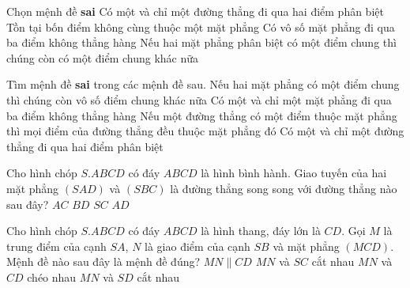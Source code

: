 \begin{ex}%
	Chọn mệnh đề {\bf sai}
	\choice
	{Có một và chỉ một đường thẳng đi qua hai điểm phân biệt}
	{Tồn tại bốn điểm không cùng thuộc một mặt phẳng}
	{\True Có vô số mặt phẳng đi qua ba điểm không thẳng hàng}
	{Nếu hai mặt phẳng phân biệt có một điểm chung thì chúng còn có một điểm chung khác nữa}
\end{ex}
\begin{ex}%
	Tìm mệnh đề \textbf{sai} trong các mệnh đề sau.
	\choice
	{Nếu hai mặt phẳng có một điểm chung thì chúng còn vô số điểm chung khác nữa}
	{Có một và chỉ một mặt phẳng đi qua ba điểm không thẳng hàng}
	{\True Nếu một đường thẳng có một điểm thuộc mặt phẳng thì mọi điểm của đường thẳng đều thuộc mặt phẳng đó}
	{Có một và chỉ một đường thẳng đi qua hai điểm phân biệt}
\end{ex}
\begin{ex}%
	Cho hình chóp $ S.ABCD $ có đáy $ ABCD $ là hình bình hành. Giao tuyến của hai mặt phẳng $ (SAD) $ và $ (SBC) $ là đường thẳng song song với đường thẳng nào sau đây?
	\choice
	{$ AC $}
	{$ BD $}
	{$ SC $}
	{\True $ AD $}
\end{ex}
\begin{ex}%
	Cho hình chóp $S.ABCD$ có đáy $ABCD$ là hình thang, đáy lớn là $CD$. Gọi $M$ là trung điểm của cạnh $SA$, $N$ là giao điểm của cạnh $SB$  và mặt phẳng $(MCD)$. Mệnh đề nào sau đây là mệnh đề đúng?
	\choice
	{\True $MN \parallel CD$}
	{$MN$ và $SC$ cắt nhau}
	{$MN$ và $CD$ chéo nhau}
	{$MN$ và $SD$ cắt nhau}
\end{ex}
